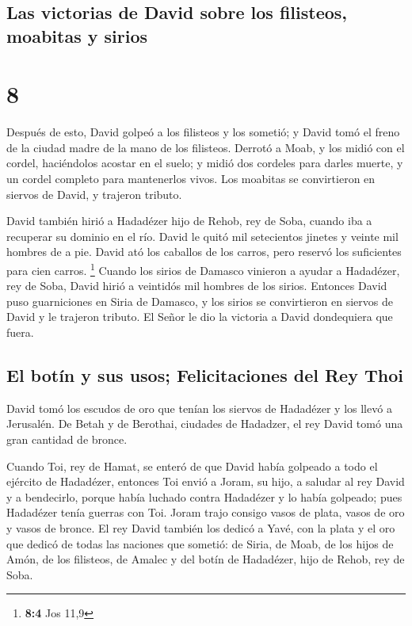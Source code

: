 \hypertarget{las-victorias-de-david-sobre-los-filisteos-moabitas-y-sirios}{%
\subsection{Las victorias de David sobre los filisteos, moabitas y
sirios}\label{las-victorias-de-david-sobre-los-filisteos-moabitas-y-sirios}}

\hypertarget{section-7}{%
\section{8}\label{section-7}}

 Después de esto, David golpeó a los filisteos y los
sometió; y David tomó el freno de la ciudad madre de la mano de los
filisteos.  Derrotó a Moab, y los midió con el cordel,
haciéndolos acostar en el suelo; y midió dos cordeles para darles
muerte, y un cordel completo para mantenerlos vivos. Los moabitas se
convirtieron en siervos de David, y trajeron tributo.

 David también hirió a Hadadézer hijo de Rehob, rey de
Soba, cuando iba a recuperar su dominio en el río.  David
le quitó mil setecientos jinetes y veinte mil hombres de a pie. David
ató los caballos de los carros, pero reservó los suficientes para cien
carros. \footnote{\textbf{8:4} Jos 11,9}  Cuando los
sirios de Damasco vinieron a ayudar a Hadadézer, rey de Soba, David
hirió a veintidós mil hombres de los sirios.  Entonces
David puso guarniciones en Siria de Damasco, y los sirios se
convirtieron en siervos de David y le trajeron tributo. El Señor le dio
la victoria a David dondequiera que fuera.

\hypertarget{el-botuxedn-y-sus-usos-felicitaciones-del-rey-thoi}{%
\subsection{El botín y sus usos; Felicitaciones del Rey
Thoi}\label{el-botuxedn-y-sus-usos-felicitaciones-del-rey-thoi}}

 David tomó los escudos de oro que tenían los siervos de
Hadadézer y los llevó a Jerusalén.  De Betah y de
Berothai, ciudades de Hadadzer, el rey David tomó una gran cantidad de
bronce.

 Cuando Toi, rey de Hamat, se enteró de que David había
golpeado a todo el ejército de Hadadézer,  entonces Toi
envió a Joram, su hijo, a saludar al rey David y a bendecirlo, porque
había luchado contra Hadadézer y lo había golpeado; pues Hadadézer tenía
guerras con Toi. Joram trajo consigo vasos de plata, vasos de oro y
vasos de bronce.  El rey David también los dedicó a Yavé,
con la plata y el oro que dedicó de todas las naciones que sometió:
 de Siria, de Moab, de los hijos de Amón, de los
filisteos, de Amalec y del botín de Hadadézer, hijo de Rehob, rey de
Soba.

